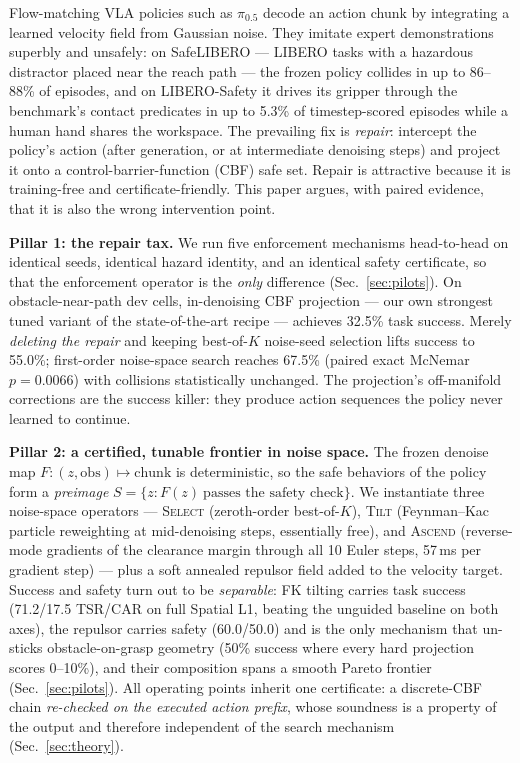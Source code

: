 \documentclass[conference]{IEEEtran}
\begin{document}
Flow-matching VLA policies such as $\pi_{0.5}$ decode an action chunk by integrating a learned velocity field from Gaussian noise. They imitate expert demonstrations superbly and unsafely: on SafeLIBERO --- LIBERO tasks with a hazardous distractor placed near the reach path --- the frozen policy collides in up to 86--88\% of episodes, and on LIBERO-Safety it drives its gripper through the benchmark's contact predicates in up to 5.3\% of timestep-scored episodes while a human hand shares the workspace. The prevailing fix is \emph{repair}: intercept the policy's action (after generation, or at intermediate denoising steps) and project it onto a control-barrier-function (CBF) safe set. Repair is attractive because it is training-free and certificate-friendly. This paper argues, with paired evidence, that it is also the wrong intervention point.

\textbf{Pillar 1: the repair tax.} We run five enforcement mechanisms head-to-head on identical seeds, identical hazard identity, and an identical safety certificate, so that the enforcement operator is the \emph{only} difference (Sec.~\ref{sec:pilots}). On obstacle-near-path dev cells, in-denoising CBF projection --- our own strongest tuned variant of the state-of-the-art recipe \cite{sota2607} --- achieves 32.5\% task success. Merely \emph{deleting the repair} and keeping best-of-$K$ noise-seed selection lifts success to 55.0\%; first-order noise-space search reaches 67.5\% (paired exact McNemar $p=0.0066$) with collisions statistically unchanged. The projection's off-manifold corrections are the success killer: they produce action sequences the policy never learned to continue.

\textbf{Pillar 2: a certified, tunable frontier in noise space.} The frozen denoise map $F:(z,\mathrm{obs})\mapsto\text{chunk}$ is deterministic, so the safe behaviors of the policy form a \emph{preimage} $S=\{z: F(z)\ \text{passes the safety check}\}$. We instantiate three noise-space operators --- \textsc{Select} (zeroth-order best-of-$K$), \textsc{Tilt} (Feynman--Kac particle reweighting at mid-denoising steps, essentially free), and \textsc{Ascend} (reverse-mode gradients of the clearance margin through all 10 Euler steps, 57\,ms per gradient step) --- plus a soft annealed repulsor field added to the velocity target. Success and safety turn out to be \emph{separable}: FK tilting carries task success (71.2/17.5 TSR/CAR on full Spatial L1, beating the unguided baseline on both axes), the repulsor carries safety (60.0/50.0) and is the only mechanism that un-sticks obstacle-on-grasp geometry (50\% success where every hard projection scores 0--10\%), and their composition spans a smooth Pareto frontier (Sec.~\ref{sec:pilots}). All operating points inherit one certificate: a discrete-CBF chain \emph{re-checked on the executed action prefix}, whose soundness is a property of the output and therefore independent of the search mechanism (Sec.~\ref{sec:theory}).
\end{document}
